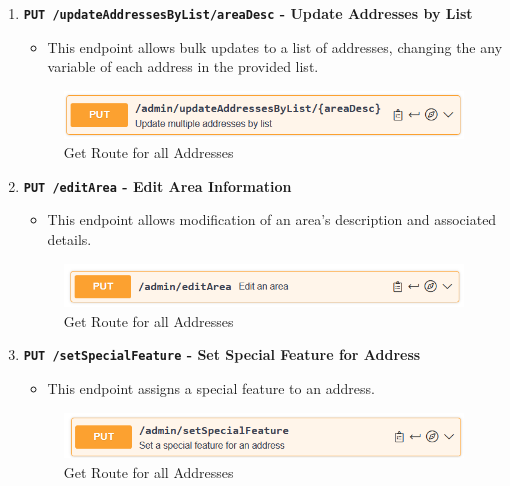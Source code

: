 \begin{enumerate}
        \item \textbf{\texttt{PUT /updateAddressesByList/{areaDesc}} - Update Addresses by List}
        \begin{itemize}
            \item This endpoint allows bulk updates to a list of addresses, changing the any variable of each address in the provided list.
        \end{itemize} 
        \begin{figure} [H]
            \centering
            \includegraphics [width=1\textwidth] {images/andreas/praxis/updateAddressByList.png}
            \caption{Get Route for all Addresses}
        \end{figure}

        \item \textbf{\texttt{PUT /editArea} - Edit Area Information}
        \begin{itemize}
            \item This endpoint allows modification of an area’s description and associated details.
        \end{itemize} 
        \begin{figure} [H]
            \centering
            \includegraphics [width=1\textwidth] {images/andreas/praxis/editArea.png}
            \caption{Get Route for all Addresses}
        \end{figure}

        \item \textbf{\texttt{PUT /setSpecialFeature} - Set Special Feature for Address}
        \begin{itemize}
            \item This endpoint assigns a special feature to an address.
        \end{itemize} 
        \begin{figure} [H]
            \centering
            \includegraphics [width=1\textwidth] {images/andreas/praxis/setSFOfAddress.png}
            \caption{Get Route for all Addresses}
        \end{figure}


\end{enumerate}

